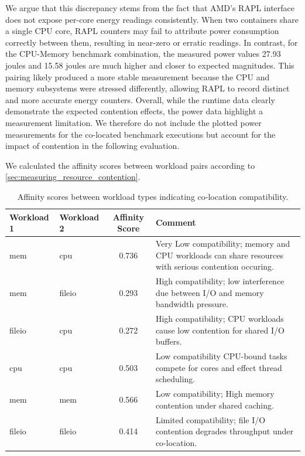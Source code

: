 We argue that this discrepancy stems from the fact that AMD's RAPL interface does not expose per-core energy readings consistently. When two containers share a single CPU core, RAPL counters may fail to attribute power consumption correctly between them, resulting in near-zero or erratic readings. In contrast, for the CPU-Memory benchmark combination, the measured power values 27.93 joules and 15.58 joules are much higher and closer to expected magnitudes. This pairing likely produced a more stable measurement because the CPU and memory subsystems were stressed differently, allowing RAPL to record distinct and more accurate energy counters.
Overall, while the runtime data clearly demonstrate the expected contention effects, the power data highlight a measurement limitation. We therefore do not include the plotted power measurements for the co-located benchmark executions but account for the impact of contention in the following evaluation.


We calculated the affinity scores between workload pairs according to \ref{sec:measuring_resource_contention}.

\begin{table}[H]
    \centering
    \begin{tabularx}{\textwidth}{l l c X}
        \toprule
        \textbf{Workload 1} & \textbf{Workload 2} & \textbf{Affinity Score} & \textbf{Comment}                                                                                       \\
        \midrule
        mem                 & cpu                 & 0.736                   & Very Low compatibility; memory and CPU workloads can share resources with serious contention occuring. \\
        mem                 & fileio              & 0.293                   & High compatibility; low interference due between I/O and memory bandwidth pressure.                    \\
        fileio              & cpu                 & 0.272                   & High compatibility; CPU workloads cause low contention for shared I/O buffers.                         \\
        cpu                 & cpu                 & 0.503                   & Low compatibility CPU-bound tasks compete for cores and effect thread scheduling.                      \\
        mem                 & mem                 & 0.566                   & Low compatibility; High memory contention under shared caching.                                        \\
        fileio              & fileio              & 0.414                   & Limited compatibility; file I/O contention degrades throughput under co-location.                      \\
        \bottomrule
    \end{tabularx}
    \small
    \caption{Affinity scores between workload types indicating co-location compatibility.}
    \label{tab:affinity_scores}
\end{table}

